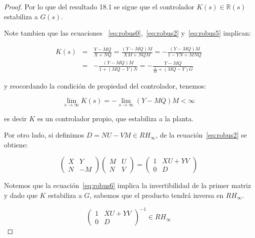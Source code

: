 \begin{proof}
            Por lo que del resultado 18.1 se sigue que el controlador $K(s) \in \mathbb{R}(s)$ estabiliza a $G(s)$.

            Note tambien que las ecuaciones ~\ref{eq:robus0},~\ref{eq:robus2} y~\ref{eq:robus5} implican:

            \begin{eqnarray*}
                K(s) & = & \frac{Y - MQ}{X + NQ} =\frac{(Y - MQ)M}{XM + NQM} = - \frac{(Y - MQ)M}{1 - YN + MNQ} \\
                 & = & - \frac{(Y - MQ)M}{1 + (MQ - Y)N} = - \frac{Y - MQ}{\frac{1}{M} + (MQ - Y)G}
            \end{eqnarray*}

            y reocordando la condición de propiedad del controlador, tenemos:

            \begin{equation*}
                \lim_{s \to \infty} K(s) = - \lim_{s \to \infty} (Y - MQ) M < \infty
            \end{equation*}

            es decir $K$ es un controlador propio, que estabiliza a la planta.

            Por otro lado, si definimos $D = NU - VM \in RH_{\infty}$, de la ecuación~\ref{eq:robus2} se obtiene:

            \begin{equation} \label{eq:robus10}
                \begin{pmatrix}
                    X & Y \\
                    N & -M
                \end{pmatrix}
                \begin{pmatrix}
                    M & U \\
                    N & V
                \end{pmatrix} =
                \begin{pmatrix}
                    1 & XU + YV \\
                    0 & D
                \end{pmatrix}
            \end{equation}

            Notemos que la ecuación~\ref{eq:robus6} implica la invertibilidad de la primer matriz y dado que $K$ estabiliza a $G$, sabemos que el producto tendrá inversa en $RH_{\infty}$.

            \begin{equation*}
                \begin{pmatrix}
                    1 & XU + YV \\
                    0 & D
                \end{pmatrix}^{-1} \in RH_{\infty}
            \end{equation*}


\end{proof}
